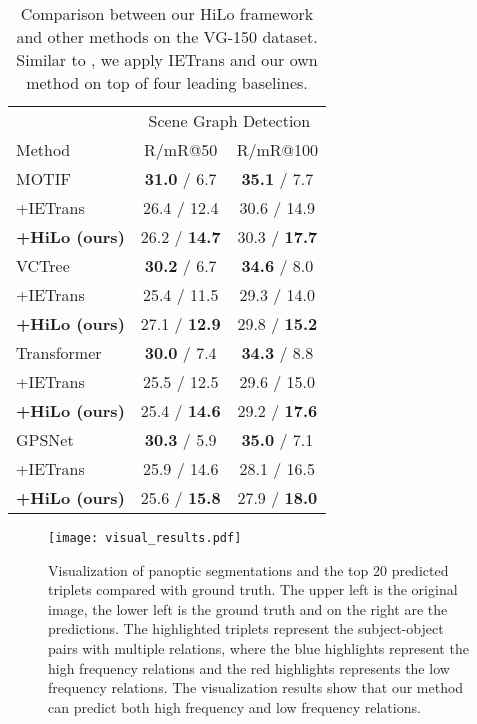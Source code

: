 \begin{table}\small
    \centering
    \begin{tabular}{l|cc}
    \hline
        ~  & \multicolumn{2}{c}{Scene Graph Detection} \\
        \cline{2-3}
        Method & R/mR@50 & R/mR@100 \\
        \hline
        MOTIF \cite{zellers2018neural} & \textbf{31.0} / 6.7 & \textbf{35.1} / 7.7 \\
        \quad +IETrans \cite{zhang2022fine} & 26.4 / 12.4 & 30.6 / 14.9 \\
        \quad \textbf{+HiLo (ours)} & 26.2 / \textbf{14.7} & 30.3 / \textbf{17.7}  \\
        \hline
        VCTree \cite{tang2019learning} & \textbf{30.2} / 6.7 & \textbf{34.6} / 8.0 \\
        \quad +IETrans \cite{zhang2022fine} & 25.4 / 11.5 & 29.3 / 14.0 \\
        \quad \textbf{+HiLo (ours)} & 27.1 / \textbf{12.9} & 29.8 / \textbf{15.2} \\
        \hline
        Transformer \cite{tang2020unbiased} & \textbf{30.0} / 7.4 & \textbf{34.3} / 8.8 \\
        \quad +IETrans \cite{zhang2022fine} & 25.5 / 12.5 & 29.6 / 15.0 \\
        \quad \textbf{+HiLo (ours)} & 25.4 / \textbf{14.6} & 29.2 / \textbf{17.6} \\
        \hline
        GPSNet \cite{lin2020gps} & \textbf{30.3} / 5.9 & \textbf{35.0} / 7.1 \\
        \quad +IETrans \cite{zhang2022fine} & 25.9 / 14.6 & 28.1 / 16.5 \\
        \quad \textbf{+HiLo (ours)} & 25.6 / \textbf{15.8} & 27.9 / \textbf{18.0} \\
        \hline
    \end{tabular}
    \vspace{+1mm}
    \caption{Comparison between our HiLo framework and other methods on the VG-150 dataset. Similar to \cite{zhang2022fine}, we apply IETrans and our own method on top of four leading baselines.
    }
    \vspace{-5mm}
    \label{table:vg_main_results}
\end{table}

\begin{figure*}
\begin{center}
\texttt{[image: visual\_results.pdf]}
\end{center}
    \vspace{-5mm}
   \caption{Visualization of panoptic segmentations and the top 20 predicted triplets compared with ground truth.
   The upper left is the original image, the lower left is the ground truth and on the right are the predictions.
   The highlighted triplets represent the subject-object pairs with multiple relations, where the blue highlights represent the high frequency relations and the red highlights represents the low frequency relations.
   The visualization results show that our method can predict both high frequency and low frequency relations.
   }
\vspace{-4mm}
\label{fig:visual}
\end{figure*}

